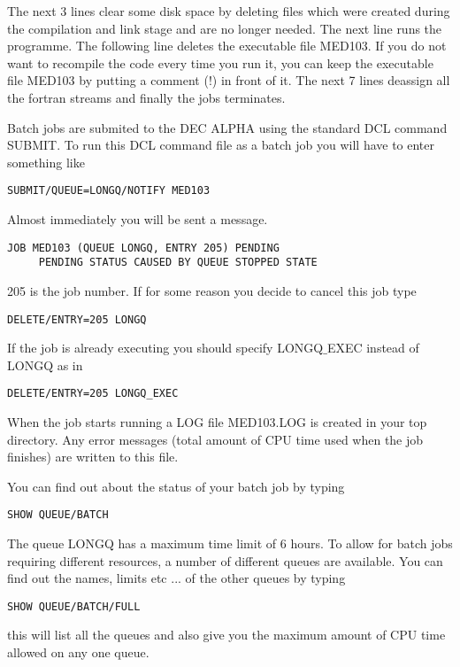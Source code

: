 The next 3 lines clear some disk space by deleting
files which were created during the compilation and link stage and
are no longer needed. The next line runs the programme.
The following line deletes the executable file MED103.
If you do not want to recompile the code every time you run it,
you can keep the executable file MED103 by putting a comment (!)
in front of it. The next 7
lines deassign all the fortran streams and finally  the jobs terminates.

Batch jobs are submited to the DEC ALPHA using the standard DCL
command SUBMIT. 
To run this DCL command file as a batch job you will have to enter something like
\begin{verbatim}
SUBMIT/QUEUE=LONGQ/NOTIFY MED103
\end{verbatim}

Almost immediately you will be sent a message.
\begin{verbatim}
JOB MED103 (QUEUE LONGQ, ENTRY 205) PENDING
     PENDING STATUS CAUSED BY QUEUE STOPPED STATE
\end{verbatim}

205 is the job number. If for some reason you decide to cancel
this job type
\begin{verbatim}
DELETE/ENTRY=205 LONGQ
\end{verbatim}
If the job is already executing you should specify LONGQ$\_$EXEC instead of LONGQ as in
\begin{verbatim}
DELETE/ENTRY=205 LONGQ_EXEC
\end{verbatim}

When the job starts running a LOG file
MED103.LOG is created in your top directory.
Any error messages (total amount of CPU time used when the job finishes)
are written to this file.

You can find out about the status of your batch job by typing
\begin{verbatim}
SHOW QUEUE/BATCH
\end{verbatim}

The queue LONGQ has a maximum time limit of 6 hours.
To allow for batch jobs requiring different resources,
a number of different queues are available.
You can  find out the names, limits etc ...  of the other queues by
typing 
\begin{verbatim}
SHOW QUEUE/BATCH/FULL
\end{verbatim}
this will list all the queues and also give
you the maximum amount of CPU time allowed on any one queue.

